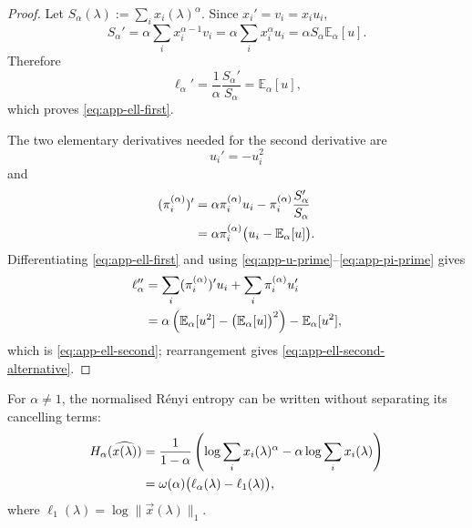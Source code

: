 \documentclass[aps,pra,11pt,onecolumn,nofootinbib,tightenlines]{revtex4-2}
\theoremstyle{definition}
\begin{document}
\begin{proof}
Let $S_\alpha(\lambda):=\sum_i x_i(\lambda)^\alpha$.  Since $x_i'=v_i=x_i u_i$,
\begin{equation}
 S_\alpha'
 =\alpha\sum_i x_i^{\alpha-1}v_i
 =\alpha\sum_i x_i^\alpha u_i
 =\alpha S_\alpha\mathbb E_\alpha[u].
 \label{eq:app-S-alpha-path-first}
\end{equation}
Therefore
\begin{equation}
 \ell_\alpha'
 =\frac1\alpha\frac{S_\alpha'}{S_\alpha}
 =\mathbb E_\alpha[u],
 \label{eq:app-ell-first-derivation}
\end{equation}
which proves \eqref{eq:app-ell-first}.

The two elementary derivatives needed for the second derivative are
\begin{equation}
 u_i'=-u_i^2
 \label{eq:app-u-prime}
\end{equation}
and
\begin{align}
 (\pi_i^{(\alpha)})'
 &=\alpha\pi_i^{(\alpha)}u_i
  -\pi_i^{(\alpha)}\frac{S_\alpha'}{S_\alpha}
 \notag\\
 &=\alpha\pi_i^{(\alpha)}
  \bigl(u_i-\mathbb E_\alpha[u]\bigr).
 \label{eq:app-pi-prime}
\end{align}
Differentiating \eqref{eq:app-ell-first} and using \eqref{eq:app-u-prime}--\eqref{eq:app-pi-prime} gives
\begin{align}
 \ell_\alpha''
 &=\sum_i(\pi_i^{(\alpha)})'u_i
   +\sum_i\pi_i^{(\alpha)}u_i'
 \notag\\
 &=\alpha\left(
   \mathbb E_\alpha[u^2]
   -\bigl(\mathbb E_\alpha[u]\bigr)^2
   \right)
   -\mathbb E_\alpha[u^2],
 \label{eq:app-ell-second-derivation}
\end{align}
which is \eqref{eq:app-ell-second}; rearrangement gives \eqref{eq:app-ell-second-alternative}.
\end{proof}

For $\alpha\neq1$, the normalised R\'enyi entropy can be written without separating its cancelling terms:
\begin{align}
 H_\alpha(\widehat{x(\lambda)})
 &=\frac1{1-\alpha}
   \left(
    \log\sum_ix_i(\lambda)^\alpha
    -\alpha\log\sum_ix_i(\lambda)
   \right)
 \notag\\
 &=\omega(\alpha)
   \bigl(\ell_\alpha(\lambda)-\ell_1(\lambda)\bigr),
 \label{eq:app-cancelled-entropy}
\end{align}
where $\ell_1(\lambda)=\log\|\vec x(\lambda)\|_1$.
\end{document}
